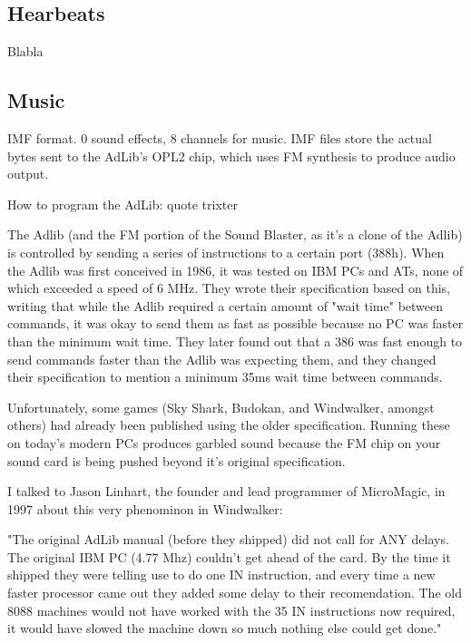 \subsection{Hearbeats}

Blabla


\subsection{Music}
IMF format. 0 sound effects, 8 channels for music. IMF files store the actual bytes sent to the AdLib's OPL2 chip, which uses FM synthesis to produce audio output.
\par
How to program the AdLib: quote trixter\\
\par
The Adlib (and the FM portion of the Sound Blaster, as it's a clone of the Adlib) is controlled by sending a series of instructions to a certain port (388h). When the Adlib was first conceived in 1986, it was tested on IBM PCs and ATs, none of which exceeded a speed of 6 MHz. They wrote their specification based on this, writing that while the Adlib required a certain amount of "wait time" between commands, it was okay to send them as fast as possible because no PC was faster than the minimum wait time. They later found out that a 386 was fast enough to send commands faster than the Adlib was expecting them, and they changed their specification to mention a minimum 35ms wait time between commands.\\
\par
Unfortunately, some games (Sky Shark, Budokan, and Windwalker, amongst others) had already been published using the older specification. Running these on today's modern PCs produces garbled sound because the FM chip on your sound card is being pushed beyond it's original specification.\\
\par
I talked to Jason Linhart, the founder and lead programmer of MicroMagic, in 1997 about this very phenominon in Windwalker:\\
\par

"The original AdLib manual (before they shipped) did not call for ANY delays. The original IBM PC (4.77 Mhz) couldn't get ahead of the card. By the time it shipped they were telling use to do one IN instruction, and every time a new faster processor came out they added some delay to their recomendation. The old 8088 machines would not have worked with the 35 IN instructions now required, it would have slowed the machine down so much nothing else could get done."
\par

